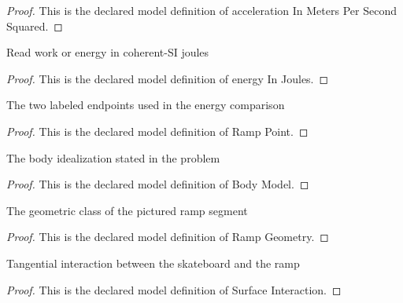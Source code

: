\begin{proof}
  This is the declared model definition of acceleration In Meters Per Second Squared.
\end{proof}
\begin{definition}
  \label{def:physics:phyx-mini-0811:phyxminiproblems-problemphyxmini0811-energyinjoules}
  Read work or energy in coherent-SI joules
\end{definition}
\begin{proof}
  This is the declared model definition of energy In Joules.
\end{proof}
\begin{definition}
  \label{def:physics:phyx-mini-0811:phyxminiproblems-problemphyxmini0811-ramppoint}
  The two labeled endpoints used in the energy comparison
\end{definition}
\begin{proof}
  This is the declared model definition of Ramp Point.
\end{proof}
\begin{definition}
  \label{def:physics:phyx-mini-0811:phyxminiproblems-problemphyxmini0811-bodymodel}
  The body idealization stated in the problem
\end{definition}
\begin{proof}
  This is the declared model definition of Body Model.
\end{proof}
\begin{definition}
  \label{def:physics:phyx-mini-0811:phyxminiproblems-problemphyxmini0811-rampgeometry}
  The geometric class of the pictured ramp segment
\end{definition}
\begin{proof}
  This is the declared model definition of Ramp Geometry.
\end{proof}
\begin{definition}
  \label{def:physics:phyx-mini-0811:phyxminiproblems-problemphyxmini0811-surfaceinteraction}
  Tangential interaction between the skateboard and the ramp
\end{definition}
\begin{proof}
  This is the declared model definition of Surface Interaction.
\end{proof}
